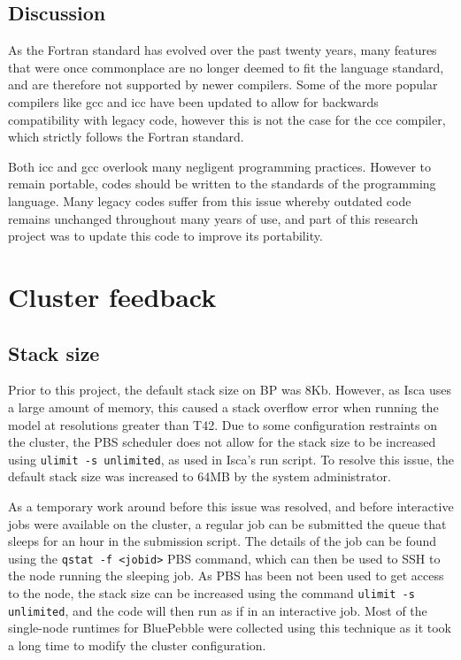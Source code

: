 \documentclass[a4paper,11pt]{report}
\begin{document}
\subsection{Discussion}
As the Fortran standard has evolved over the past twenty years, many features that were once commonplace are no longer deemed to fit the language standard, and are therefore not supported by newer compilers. Some of the more popular compilers like \gls{gcc} and \gls{icc} have been updated to allow for backwards compatibility with legacy code, however this is not the case for the \gls{cce} compiler, which strictly follows the Fortran standard.
\par
Both \gls{icc} and \gls{gcc} overlook many negligent programming practices. However to remain portable, codes should be written to the standards of the programming language. Many legacy codes suffer from this issue whereby outdated code remains unchanged throughout many years of use, and part of this research project was to update this code to improve its portability.


\section{Cluster feedback}
\subsection{Stack size}
Prior to this project, the default stack size on BP was 8Kb. However, as Isca uses a large amount of memory, this caused a stack overflow error when running the model at resolutions greater than T42. Due to some configuration restraints on the cluster, the PBS scheduler does not allow for the stack size to be increased using \texttt{ulimit -s unlimited}, as used in Isca's run script. To resolve this issue, the default stack size was increased to 64MB by the system administrator.
\par
As a temporary work around before this issue was resolved, and before interactive jobs were available on the cluster, a regular job can be submitted the queue that sleeps for an hour in the submission script. The details of the job can be found using the  \texttt{qstat -f <jobid>} PBS command, which can then be used to SSH to the node running the sleeping job. As PBS has been not been used to get access to the node, the stack size can be increased using the command \texttt{ulimit -s unlimited}, and the code will then run as if in an interactive job. Most of the single-node runtimes for BluePebble were collected using this technique as it took a long time to modify the cluster configuration. 
\end{document}
